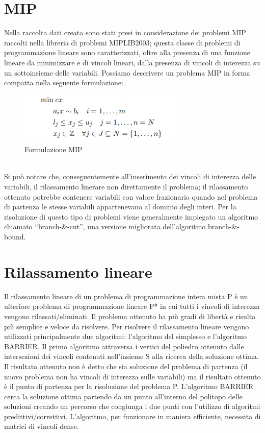 \documentclass[12pt,a4paper,twoside,openright]{book}
\begin{document}
\section{MIP}
Nella raccolta dati creata sono stati presi in considerazione dei problemi
MIP raccolti nella libreria di problemi MIPLIB2003; questa classe di problemi
di programmazione lineare sono caratterizzati, oltre alla presenza di una funzione
lineare da minimizzare e di vincoli lineari, dalla presenza di vincoli di interezza
su un sottoinsieme delle variabili. Possiamo descrivere un problema MIP in forma compatta
nella seguente formulazione: \pagebreak
\begin{figure}[ht]
    \centering
    \includegraphics [scale = 0.7]{mip_scheme.png}
    \caption{ Formulazione MIP }
    \label{fig:mip}
\end{figure}
\\
Si può notare che, conseguentemente all’inserimento dei vincoli di interezza delle variabili,
il rilassamento linerare non direttamente il problema; il rilassamento ottenuto potrebbe contenere variabili con valore frazionario
quando nel problema di partenza le stesse variabili appartenevano al dominio degli interi.
Per la risoluzione di questo tipo di problemi viene generalmente impiegato un algoritmo 
chiamato “branch-\&-cut”, una versione migliorata dell’algoritmo branch-\&-bound.

\section{Rilassamento lineare}
Il rilassamento lineare di un problema di programmazione intera mista P è un ulteriore problema di programmazione lineare P* in cui
tutti i vincoli di interezza vengono rilassati/eliminati. Il problema ottenuto ha più gradi di libertà
e risulta più semplice e veloce da risolvere. Per risolvere il rilassamento lineare vengono utilizzati principalmente
due algoritmi: l'algoritmo del simplesso e l'algoritmo BARRIER. Il primo algoritmo attraversa i vertici del poliedro ottenuto dalle intersezioni 
dei vincoli contenuti nell'insieme S alla ricerca della soluzione ottima. Il risultato ottenuto non 
è detto che sia soluzione del problema di partenza (il nuovo problema non ha vincoli di interezza sulle 
variabili) ma il risultato ottenuto è il punto di partenza per la risoluzione del problema P. 
L'algoritmo BARRIER cerca la soluzione ottima partendo da un punto all'interno del politopo delle soluzioni 
creando un percorso che congiunga i due punti con l'utilizzo di algoritmi predittivi/correttivi. L'algoritmo, per funzionare 
in maniera efficiente, necessita di matrici di vincoli dense.
    
\end{document}
